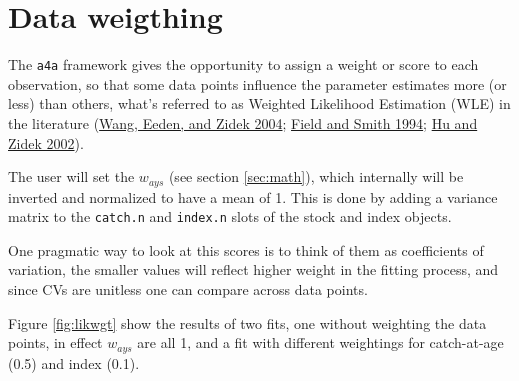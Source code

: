 \documentclass[
]{book}
\begin{document}
\hypertarget{data-weigthing}{%
\section{Data weigthing}\label{data-weigthing}}

The \texttt{a4a} framework gives the opportunity to assign a weight or score to each observation, so that some data points influence the parameter estimates more (or less) than others, what's referred to as Weighted Likelihood Estimation (WLE) in the literature (\protect\hyperlink{ref-wang2004asymptotic}{Wang, Eeden, and Zidek 2004}; \protect\hyperlink{ref-fieldwle}{Field and Smith 1994}; \protect\hyperlink{ref-hu2002weighted}{Hu and Zidek 2002}).

The user will set the \(w_{ays}\) (see section \ref{sec:math}), which internally will be inverted and normalized to have a mean of 1. This is done by adding a variance matrix to the \texttt{catch.n} and \texttt{index.n} slots of the stock and index objects.

One pragmatic way to look at this scores is to think of them as coefficients of variation, the smaller values will reflect higher weight in the fitting process, and since CVs are unitless one can compare across data points.

Figure \ref{fig:likwgt} show the results of two fits, one without weighting the data points, in effect \(w_{ays}\) are all 1, and a fit with different weightings for catch-at-age (0.5) and index (0.1).
\end{document}
